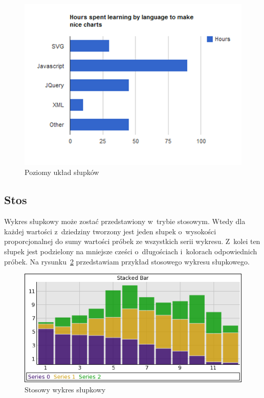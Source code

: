 \begin{figure}[H]
\centering
\includegraphics[scale=0.8]{img/bar-hor.png}
\caption{Poziomy układ słupków}\label{rys:wykres:poziom}
\end{figure}

\subsection{Stos}
Wykres słupkowy może zostać przedstawiony w~trybie stosowym. Wtedy dla każdej wartości z~dziedziny tworzony jest jeden słupek o~wysokości proporcjonalnej do sumy wartości próbek ze wszystkich serii wykresu. Z~kolei ten słupek jest podzielony na mniejsze cześci o~długościach i~kolorach odpowiednich próbek. Na rysunku~\ref{rys:wykres:stos} przedstawiam przykład stosowego wykresu słupkowego.

\begin{figure}[H]
\centering
\includegraphics[scale=0.8]{img/stacked-bar.png}
\caption{Stosowy wykres słupkowy}\label{rys:wykres:stos}
\end{figure}


